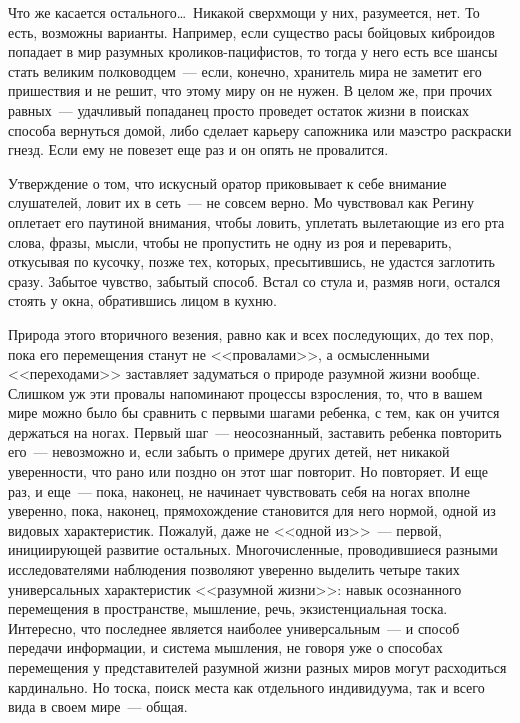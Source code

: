 Что же касается остального\ldots\ Никакой сверхмощи у них, разумеется, нет. То 
есть, 
возможны варианты. Например, если существо расы бойцовых киброидов попадает в 
мир разумных кроликов-пацифистов, то тогда у него есть все шансы стать великим 
полководцем~--- если, конечно, хранитель мира не заметит его пришествия и не 
решит, что этому миру он не нужен. В целом же, при прочих равных~--- удачливый 
попаданец просто проведет остаток жизни в поисках способа вернуться домой, либо 
сделает карьеру сапожника или маэстро раскраски гнезд. Если ему не повезет еще 
раз и он опять не провалится.

Утверждение о том, что искусный оратор приковывает к себе внимание слушателей, 
ловит их в сеть~--- не совсем верно. Мо чувствовал как Регину оплетает его 
паутиной внимания, чтобы ловить, уплетать вылетающие из его рта слова, фразы, 
мысли, чтобы не пропустить не одну из роя и переварить, откусывая по кусочку, 
позже тех, которых, пресытившись, не удастся заглотить сразу. Забытое чувство, 
забытый способ. Встал со стула и, размяв ноги, остался стоять у окна, 
обратившись лицом в кухню.

Природа этого вторичного везения, равно как и всех последующих, до тех пор, 
пока 
его перемещения станут не <<провалами>>, а осмысленными <<переходами>> 
заставляет 
задуматься о природе разумной жизни вообще. Слишком уж эти провалы напоминают 
процессы взросления, то, что в вашем мире можно было бы сравнить с первыми 
шагами ребенка, с тем, как он учится держаться на ногах. Первый шаг~--- 
неосознанный, заставить ребенка повторить его~--- невозможно и, если забыть о 
примере других детей, нет никакой уверенности, что рано или поздно он этот шаг 
повторит. Но повторяет. И еще раз, и еще~--- пока, наконец, не начинает 
чувствовать себя на ногах вполне уверенно, пока, наконец, прямохождение 
становится для него нормой, одной из видовых характеристик. Пожалуй, даже не 
<<одной из>>~--- первой, инициирующей развитие остальных. Многочисленные, 
проводившиеся разными исследователями наблюдения позволяют уверенно выделить 
четыре таких универсальных характеристик <<разумной жизни>>: навык осознанного 
перемещения в пространстве, мышление, речь, экзистенциальная тоска. Интересно, 
что последнее является наиболее универсальным~--- и способ передачи информации, 
и система мышления, не говоря уже о способах перемещения у представителей 
разумной жизни разных миров могут расходиться кардинально. Но тоска, поиск 
места 
как отдельного индивидуума, так и всего вида в своем мире~--- общая.

